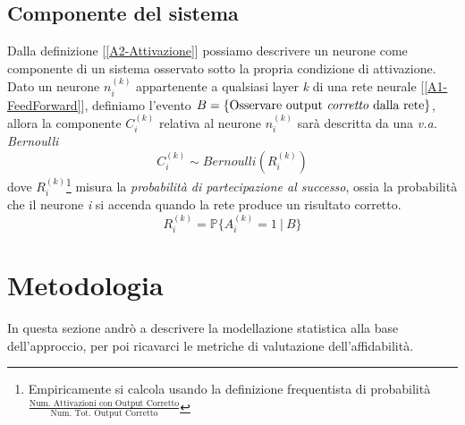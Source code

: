 \documentclass[10pt]{article} %
\begin{document}
\subsection{Componente del sistema}
\label{A3-Component}
Dalla definizione [\ref{A2-Attivazione}] possiamo descrivere un neurone come componente di un sistema osservato sotto la propria condizione di attivazione. Dato un neurone $n^{(k)}_{i}$ appartenente a qualsiasi layer \textit{k} di una rete neurale [\ref{A1-FeedForward}], definiamo l'evento $B = \{\text{Osservare output \textit{corretto} dalla rete}\}$, allora la componente $C^{(k)}_{i}$ relativa al neurone $n^{(k)}_{i}$ sarà descritta da una \textit{v.a. Bernoulli}
\begin{equation} 
    C^{(k)}_{i} \sim Bernoulli(R^{(k)}_{i})
\end{equation}
dove $R^{(k)}_{i}$\footnote{Empiricamente si calcola usando la definizione frequentista di probabilità $\frac{\mbox{Num. Attivazioni con Output Corretto}}{\mbox{Num. Tot. Output Corretto}}$}
misura la \textit{probabilità di partecipazione al successo}, ossia la probabilità che il neurone \textit{i} si accenda quando la rete produce un risultato corretto.
\begin{equation}
    R^{(k)}_{i} = \mathbb{P}\{A^{(k)}_{i} = 1\ |\ B\}
\end{equation}

\section{Metodologia}
\label{A5-k-outof-}
In questa sezione andrò a descrivere la modellazione statistica alla base dell'approccio, per poi ricavarci le metriche di valutazione dell'affidabilità.  
\end{document}
